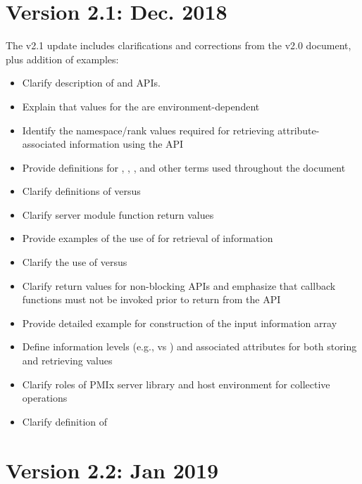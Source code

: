 \section{Version 2.1: Dec. 2018}

The v2.1 update includes clarifications and corrections from the v2.0 document, plus addition of examples:

\begin{itemize}
    \item Clarify description of  and  \acp{API}.
    \item Explain that values for the  are environment-dependent
    \item Identify the namespace/rank values required for retrieving attribute-associated information using the  \ac{API}
    \item Provide definitions for , , , and other terms used throughout the document
    \item Clarify definitions of  versus 
    \item Clarify server module function return values
    \item Provide examples of the use of  for retrieval of information
    \item Clarify the use of  versus 
    \item Clarify return values for non-blocking \acp{API} and emphasize that callback functions must not be invoked prior to return from the \ac{API}
    \item Provide detailed example for construction of the  input information array
    \item Define information levels (e.g.,  vs ) and associated attributes for both storing and retrieving values
    \item Clarify roles of \ac{PMIx} server library and host environment for collective operations
    \item Clarify definition of 
\end{itemize}

\section{Version 2.2: Jan 2019}

